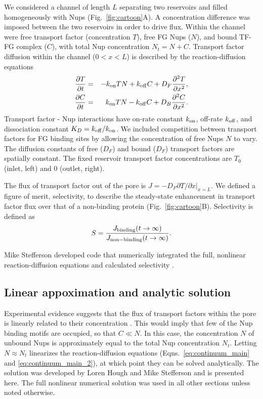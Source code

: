 We considered a channel of length $L$ separating two reservoirs and filled homogeneously with Nups
(Fig.~\ref{fig:cartoon}A).  A concentration difference was imposed between the two reservoirs in order to drive flux.  Within the channel were free transport factor (concentration $T$), free FG Nups ($N$), and bound TF-FG complex ($C$), with total Nup concentration $N_t= N+C$.  Transport factor diffusion within the channel ($0<x<L$) is described by the reaction-diffusion equations
\begin{eqnarray}
  \frac{\partial T}{\partial t} &=& -k_{\rm on} T N+k_{\rm off} C +D_F
       \frac{\partial^2 T}{\partial x^2},\label{eq:continuum_main} 
   \\ 
  \frac{\partial C}{\partial t} &=& k_{\rm on} T N -k_{\rm off} C + 
        D_B \frac{\partial^2 C}{\partial x^2} .
\label{eq:continuum_main_2} 
\end{eqnarray}
Transport factor - Nup interactions have on-rate constant $k_{\rm on}$, off-rate $k_{\rm off}$, and
dissociation constant $K_D =k_{\rm off}/k_{\rm on}$.  We included competition
between transport factors for FG binding sites by allowing the concentration of free Nups $N$ to vary\cite{timney16}.  The
diffusion constants of free ($D_F$) and bound ($D_F$) transport factors are
spatially constant. The fixed reservoir transport factor concentrations are $T_0$
(inlet, left) and 0 (outlet, right).

The flux of transport factor out of the pore is
$J = - D_F \left. \partial T/\partial x \right|_{x=L}$.
We defined a figure of merit, selectivity, to describe the steady-state enhancement in transport factor flux over that of a non-binding protein (Fig.~\ref{fig:cartoon}B).  Selectivity is defined as
\begin{equation}
  S =  \frac{J_{\rm binding}(t \to \infty)}{J_{\rm non-binding}(t \to \infty)} .
\end{equation}

Mike Stefferson developed code that numerically integrated the full, nonlinear reaction-diffusion equations and calculated selectivity \cite{stefferson18}.

\subsection{Linear appoximation and analytic solution}
\label{sec:linear}
Experimental evidence suggests that the flux of transport factors within the pore is linearly related to their concentration \cite{timney06, schmidt15}.  This would imply that few of the Nup binding motifs are occupied, so that $C \ll N$.  In this case, the concentration $N$ of unbound Nups is approximately equal to the total Nup concentration $N_t$.  Letting $N \approx N_t$ linearizes the reaction-diffusion equations (Eqns.~\ref{eq:continuum_main} and \ref{eq:continuum_main_2}), at which point they can be solved analytically.  The solution was developed by Loren Hough and Mike Stefferson and is presented here.  The full nonlinear numerical solution was used in all other sections unless noted otherwise.


